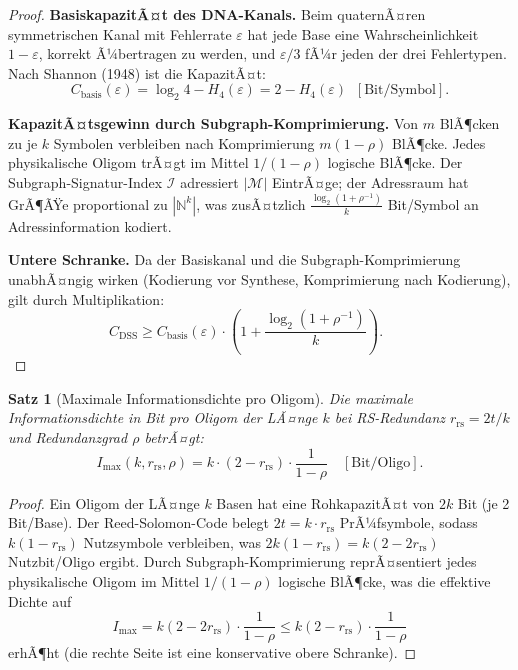 ﻿\documentclass[a4paper,12pt]{article}
\theoremstyle{definition}
\theoremstyle{plain}
\newtheorem{satz}{Satz}[section]
\begin{document}
\begin{proof}
  \textbf{BasiskapazitÃ¤t des DNA-Kanals.}
  Beim quaternÃ¤ren symmetrischen Kanal mit Fehlerrate $\varepsilon$ hat jede
  Base eine Wahrscheinlichkeit $1-\varepsilon$, korrekt Ã¼bertragen zu werden,
  und $\varepsilon/3$ fÃ¼r jeden der drei Fehlertypen.  Nach Shannon (1948)
  ist die KapazitÃ¤t:
  \[
    C_{\mathrm{basis}}(\varepsilon)
    = \log_2 4 - H_4(\varepsilon)
    = 2 - H_4(\varepsilon) \;\; [\text{Bit/Symbol}].
  \]

  \textbf{KapazitÃ¤tsgewinn durch Subgraph-Komprimierung.}
  Von $m$ BlÃ¶cken zu je $k$ Symbolen verbleiben nach Komprimierung
  $m(1-\rho)$ BlÃ¶cke.  Jedes physikalische Oligom trÃ¤gt im Mittel
  $1/(1-\rho)$ logische BlÃ¶cke.  Der Subgraph-Signatur-Index $\mathcal{I}$
  adressiert $|\mathcal{M}|$ EintrÃ¤ge; der Adressraum hat GrÃ¶ÃŸe
  proportional zu $|\mathbb{N}^k|$, was zusÃ¤tzlich
  $\frac{\log_2(1 + \rho^{-1})}{k}$ Bit/Symbol an Adressinformation
  kodiert.

  \textbf{Untere Schranke.}
  Da der Basiskanal und die Subgraph-Komprimierung unabhÃ¤ngig
  wirken (Kodierung vor Synthese, Komprimierung nach Kodierung), gilt
  durch Multiplikation:
  \[
    C_{\mathrm{DSS}} \ge C_{\mathrm{basis}}(\varepsilon) \cdot
    \left(1 + \frac{\log_2(1+\rho^{-1})}{k}\right). \qquad 
  \]
\end{proof}

\begin{satz}[Maximale Informationsdichte pro Oligom]
\label{satz:max_dichte}
  Die maximale Informationsdichte in Bit pro Oligom der LÃ¤nge $k$ bei
  RS-Redundanz $r_{\mathrm{rs}} = 2t/k$ und Redundanzgrad $\rho$ betrÃ¤gt:
  \[
    I_{\max}(k, r_{\mathrm{rs}}, \rho) =
    k \cdot (2 - r_{\mathrm{rs}}) \cdot \frac{1}{1-\rho}
    \quad [\text{Bit/Oligo}].
  \]
\end{satz}

\begin{proof}
  Ein Oligom der LÃ¤nge $k$ Basen hat eine RohkapazitÃ¤t von
  $2k$ Bit (je 2 Bit/Base).  Der Reed-Solomon-Code belegt
  $2t = k \cdot r_{\mathrm{rs}}$ PrÃ¼fsymbole, sodass
  $k(1-r_{\mathrm{rs}})$ Nutzsymbole verbleiben, was
  $2k(1-r_{\mathrm{rs}}) = k(2-2r_{\mathrm{rs}})$ Nutzbit/Oligo ergibt.
  Durch Subgraph-Komprimierung reprÃ¤sentiert jedes physikalische Oligom
  im Mittel $1/(1-\rho)$ logische BlÃ¶cke, was die effektive Dichte auf
  \[
    I_{\max} = k(2 - 2r_{\mathrm{rs}}) \cdot \frac{1}{1-\rho}
    \le k(2 - r_{\mathrm{rs}}) \cdot \frac{1}{1-\rho}
  \]
  erhÃ¶ht (die rechte Seite ist eine konservative obere Schranke). 
\end{proof}
\end{document}
